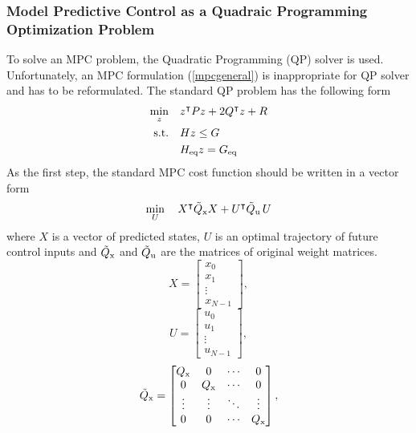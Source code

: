 \subsubsection{Model Predictive Control as a Quadraic Programming Optimization Problem}
To solve an MPC problem, the Quadratic Programming (QP) solver is used. Unfortunately, an MPC formulation (\ref{mpcgeneral}) is inappropriate for QP solver and has to be reformulated. The standard QP problem has the following form
\begin{subequations}
	\begin{align}
	\min_{z}\quad & z^\intercal Pz + 2Q^\intercal z + R\\
	\label{cst_qp}\text{s.t.}\quad&Hz\leq G\\
	&H _{\text{eq}}z = G _{\text{eq}}
	\end{align}
\end{subequations}
As the first step, the standard MPC cost function should be written in a vector form
\begin{equation}
	\min_{U}\quad X^\intercal\tilde{Q} _{\text{x}}X + U^\intercal\tilde{Q} _{\text{u}}\,U\\
\end{equation}
where $X$ is a vector of predicted states, $U$ is an optimal trajectory of future control inputs and $\tilde{Q} _{\text{x}}$ and $\tilde{Q} _{\text{u}}$ are the matrices of original weight matrices.
\begin{equation}
	X = \begin{bmatrix}
	x_0\\x_{1}\\\vdots\\x_{N-1}
		\end{bmatrix},
\end{equation}
\begin{equation}
U = \begin{bmatrix}
u_0\\u_{1}\\\vdots\\u_{N-1}
\end{bmatrix},
\end{equation}
\begin{equation}
\tilde{Q} _{\text{x}} = \begin{bmatrix}
Q _{\text{x}}&0&\cdots&0\\
0&Q _{\text{x}}&\cdots&0\\
\vdots&\vdots&\ddots&\vdots\\
0&0&\cdots&Q _{\text{x}}
\end{bmatrix},
\end{equation}
